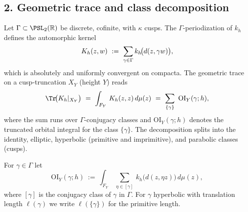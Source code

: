 \subsection*{2. Geometric trace and class decomposition}\relax\hspace{0pt}
\label{subsec:tfc4-geom-sum} %

Let $\Gamma\subset\PSL_2(\mathbb{R})$ be discrete, cofinite, with $\kappa$ cusps. \relax\hspace{0pt}
The $\Gamma$-periodization of $k_h$ defines the automorphic kernel
\begin{equation}\relax\hspace{0pt}
\label{eq:tfc4-autom-kernel}\relax\hspace{0pt}
K_h(z,w)\ :=\ \sum_{\gamma\in\Gamma} k_h\!\big(d(z,\gamma w)\big),
\end{equation}
which is absolutely and uniformly convergent on compacta. \relax\hspace{0pt}
The geometric trace on a cusp-truncation $X_Y$ (height $Y$) reads
\begin{equation}\relax\hspace{0pt}
\label{eq:tfc4-geom-trunc}\relax\hspace{0pt}
\Tr\!\big(K_h|_{X_Y}\big)\ =\ \int_{F_Y}\,K_h(z,z)\,d\mu(z)\ =\ \sum_{\{\gamma\}}\ \mathrm{OI}_Y(\gamma;h),
\end{equation}
where the sum runs over $\Gamma$-conjugacy classes and $\mathrm{OI}_Y(\gamma;h)$ denotes the truncated orbital integral for the class $\{\gamma\}$. \relax\hspace{0pt}
The decomposition splits into the identity, elliptic, hyperbolic (primitive and imprimitive), and parabolic classes (cusps). \relax\hspace{0pt}

\begin{definition}\relax\hspace{0pt}
\label{def:tfc4-OI} %
For $\gamma\in\Gamma$ let
\[
\mathrm{OI}_Y(\gamma;h)\ :=\ \int_{F_Y}\ \sum_{\eta\in[\gamma]}\ k_h\!\big(d(z,\eta z)\big)\,d\mu(z),
\]
where $[\gamma]$ is the conjugacy class of $\gamma$ in $\Gamma$. \relax\hspace{0pt}
For $\gamma$ hyperbolic with translation length $\ell(\gamma)$ we write $\ell(\{\gamma\})$ for the primitive length. \relax\hspace{0pt}
\end{definition}

